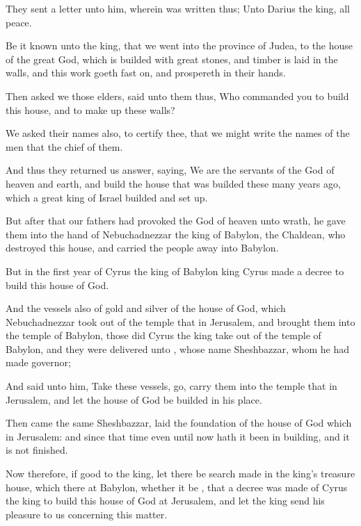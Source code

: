 {They
sent a
letter
unto him,
wherein was
written
thus; Unto
Darius the
king,
all
peace.

Be it
known unto the
king, that we
went into the
province of
Judea, to the
house of the
great
God, which is
builded with
great
stones, and
timber is
laid in the
walls, and
this
work
goeth
fast on, and
prospereth in their
hands.

Then
asked we
those
elders,
{}
said unto them
thus,
Who
commanded you to
build
this
house, and to make
up
these
walls?

We
asked their
names
also, to
certify thee, that we might
write the
names of the
men that
{} the
chief of them.

And
thus they
returned us
answer,
saying,
We
are the
servants of the
God of
heaven and
earth, and
build the
house that
was
builded
these
many
years
ago, which a
great
king of
Israel
builded and set
up.

But
after that our
fathers had
provoked the
God of
heaven unto
wrath, he
gave
them into the
hand of
Nebuchadnezzar the
king of
Babylon, the
Chaldean, who
destroyed
this
house, and
carried the
people
away into
Babylon.

But in the
first
year of
Cyrus the
king of
Babylon
{}
king
Cyrus
made a
decree to
build
this
house of
God.

And the
vessels
also
of
gold and
silver of the
house of
God, which
Nebuchadnezzar
took out
of the
temple that
{} in
Jerusalem, and
brought them into the
temple of
Babylon,
those did
Cyrus the
king
take out
of the
temple of
Babylon, and they were
delivered unto
{}, whose
name
{}
Sheshbazzar, whom he had
made
governor;

And
said unto him,
Take
these
vessels,
go,
carry
them into the
temple that
{} in
Jerusalem, and let the
house of
God be
builded
in his
place.

Then
came the
same
Sheshbazzar,
{}
laid the
foundation of the
house of
God which
{} in
Jerusalem: and
since that
time even
until
now hath it been in
building, and
{} it is
not
finished.

Now therefore,
if
{}
good
to the
king, let there be
search made in the
king’s
treasure
house, which
{}
there at
Babylon,
whether it
be
{}, that a
decree was
made
of
Cyrus the
king to
build
this
house of
God at
Jerusalem, and let the
king
send his
pleasure to us
concerning this
matter.




}
